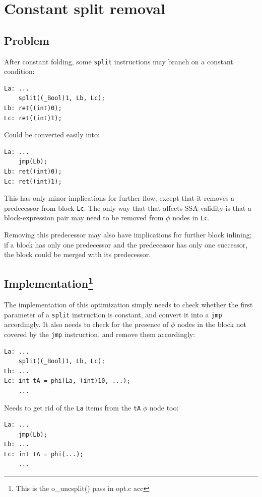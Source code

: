 \documentclass[12pt, a4paper]{article}
\begin{document}
\section{Constant split removal}
\label{sec:uncsplit}
\subsection{Problem}
After constant folding, some \verb+split+ instructions may branch on a constant
condition:

\begin{lstlisting}
La:	...
	split((_Bool)1, Lb, Lc);
Lb:	ret((int)0);
Lc:	ret((int)1);
\end{lstlisting}

Could be converted easily into:

\begin{lstlisting}
La:	...
	jmp(Lb);
Lb:	ret((int)0);
Lc:	ret((int)1);
\end{lstlisting}

This has only minor implications for further flow, except that it removes a
predecessor from block \verb+Lc+. The only way that that affects SSA validity is
that a block-expression pair may need to be removed from $\phi$ nodes in
\verb+Lc+.

Removing this predecessor may also have implications for further block inlining;
if a block has only one predecessor and the predecessor has only one successor,
the block could be merged with its predecessor.

\subsection[Implementation] {Implementation\footnote{This is the o\_uncsplit() pass in opt.c acc} }
The implementation of this optimization simply needs to check whether the first
parameter of a \verb+split+ instruction is constant, and convert it into a
\verb+jmp+ accordingly. It also needs to check for the presence of $\phi$ nodes
in the block not covered by the \verb+jmp+ instruction, and remove them accordingly:

\begin{lstlisting}
La:	...
	split((_Bool)1, Lb, Lc);
Lb:	...
Lc:	int tA = phi(La, (int)10, ...);
	...
\end{lstlisting}

Needs to get rid of the \verb+La+ items from the \verb+tA+ $\phi$ node too:

\begin{lstlisting}
La:	...
	jmp(Lb);
Lb:	...
Lc:	int tA = phi(...);
	...
\end{lstlisting}
\end{document}
